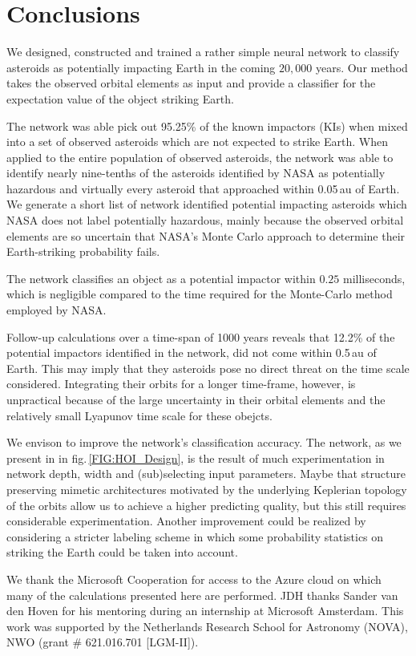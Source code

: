 \documentclass{aa}
\begin{document}
\section{Conclusions}
\label{SEC:Conclusions}

We designed, constructed and trained a rather simple neural network to
classify asteroids as potentially impacting Earth in the coming
$20,000$ years. Our method takes the observed orbital elements as
input and provide a classifier for the expectation value of the object
striking Earth.

The network was able pick out 95.25\% of the known impactors (KIs)
when mixed into a set of observed asteroids which are not expected to
strike Earth. When applied to the entire population of observed
asteroids, the network was able to identify nearly nine-tenths of the
asteroids identified by NASA as potentially hazardous and virtually
every asteroid that approached within 0.05\,au of Earth.  We generate
a short list of network identified potential impacting asteroids which
NASA does not label potentially hazardous, mainly because the observed
orbital elements are so uncertain that NASA's Monte Carlo approach to
determine their Earth-striking probability fails.

The network classifies an object as a potential impactor within $0.25$
milliseconds, which is negligible compared to the time required for
the Monte-Carlo method employed by NASA.
 
Follow-up calculations over a time-span of 1000 years reveals that
12.2\% of the potential impactors identified in the network, did not
come within 0.5\,au of Earth. This may imply that they asteroids pose
no direct threat on the time scale considered. Integrating their
orbits for a longer time-frame, however, is unpractical because of the
large uncertainty in their orbital elements and the relatively small
Lyapunov time scale for these obejcts.

We envison to improve the network's classification accuracy.  The
network, as we present in in fig.\,\ref{FIG:HOI_Design}, is the result
of much experimentation in network depth, width and (sub)selecting
input parameters. Maybe that structure preserving mimetic
architectures motivated by the underlying Keplerian topology of the
orbits allow us to achieve a higher predicting quality, but this still
requires considerable experimentation.  Another improvement could be
realized by considering a stricter labeling scheme in which some
probability statistics on striking the Earth could be taken into
account.

\begin{acknowledgements}
  
  We thank the Microsoft Cooperation for access to the Azure cloud on
  which many of the calculations presented here are performed.  JDH
  thanks Sander van den Hoven for his mentoring during an internship
  at Microsoft Amsterdam. This work was supported by the Netherlands
  Research School for Astronomy (NOVA), NWO (grant \# 621.016.701
  [LGM-II]).

\end{acknowledgements}


\end{document}
